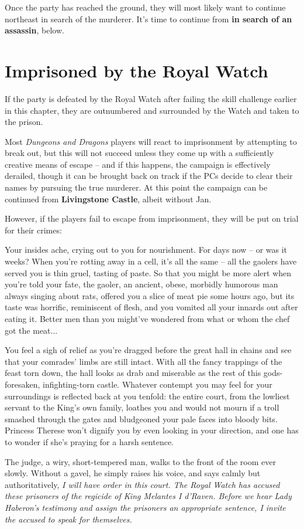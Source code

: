 \documentclass{report}
\theoremstyle{definition}
\begin{document}
Once the party has reached the ground, they will most likely want to continue northeast in search of the murderer. It's time to continue from \textbf{in search of an assassin}, below.

\section{Imprisoned by the Royal Watch}
If the party is defeated by the Royal Watch after failing the skill challenge earlier in this chapter, they are outnumbered and surrounded by the Watch and taken to the prison.

Most \textit{Dungeons and Dragons} players will react to imprisonment by attempting to break out, but this will not succeed unless they come up with a sufficiently creative means of escape -- and if this happens, the campaign is effectively derailed, though it can be brought back on track if the PCs decide to clear their names by pursuing the true murderer. At this point the campaign can be continued from \textbf{Livingstone Castle}, albeit without Jan.

However, if the players fail to escape from imprisonment, they will be put on trial for their crimes:

\begin{displayquote}
Your insides ache, crying out to you for nourishment. For days now -- or was it weeks? When you're rotting away in a cell, it's all the same -- all the gaolers have served you is thin gruel, tasting of paste. So that you might be more alert when you're told your fate, the gaoler, an ancient, obese, morbidly humorous man always singing about rats, offered you a slice of meat pie some hours ago, but its taste was horrific, reminiscent of flesh, and you vomited all your innards out after eating it. Better men than you might've wondered from what or whom the chef got the meat...

You feel a sigh of relief as you're dragged before the great hall in chains and see that your comrades' limbs are still intact. With all the fancy trappings of the feast torn down, the hall looks as drab and miserable as the rest of this gods-foresaken, infighting-torn castle. Whatever contempt you may feel for your surroundings is reflected back at you tenfold: the entire court, from the lowliest servant to the King's own family, loathes you and would not mourn if a troll smashed through the gates and bludgeoned your pale faces into bloody bits. Princess Therese won't dignify you by even looking in your direction, and one has to wonder if she's praying for a harsh sentence.

The judge, a wiry, short-tempered man, walks to the front of the room ever slowly. Without a gavel, he simply raises his voice, and says calmly but authoritatively, \textit{I will have order in this court. The Royal Watch has accused these prisoners of the regicide of King Melantes I d'Raven. Before we hear Lady Haberon's testimony and assign the prisoners an appropriate sentence, I invite the accused to speak for themselves.}
\end{displayquote}
\end{document}
